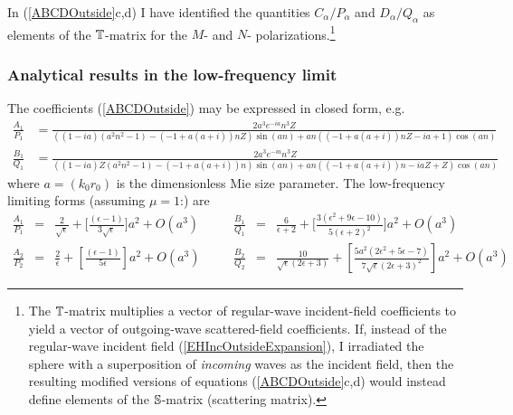 \documentclass[letterpaper]{article}
\begin{document}
In (\ref{ABCDOutside}c,d) I have identified
the quantities $C_\alpha/P_\alpha$ and $D_\alpha/Q_\alpha$
as elements of the $\mathbb{T}$-matrix for the $M$- and $N$- 
polarizations.\footnote{The $\mathbb{T}$-matrix multiplies a vector
of regular-wave incident-field coefficients to yield 
a vector of outgoing-wave scattered-field coefficients.
If, instead of the regular-wave incident field 
(\ref{EHIncOutsideExpansion}), I irradiated the sphere with
a superposition of \textit{incoming} waves as the incident field,
then the resulting modified versions of equations (\ref{ABCDOutside}c,d)
would instead define elements of the $\mathbb{S}$-matrix (scattering matrix).}

\subsubsection{Analytical results in the low-frequency limit}

The coefficients (\ref{ABCDOutside}) may be expressed in closed form, e.g.
\begin{align*}
 \frac{A_1}{P_1}
&=
   \frac{2 a^3 e^{-i a} n^3 Z}{\left((1-i a) \left(a^2 n^2-1\right)-(-1+a (a+i))
    n Z\right) \sin (a n)+a n ((-1+a (a+i)) n Z-i a+1) \cos (a n)}
\\
 \frac{B_1}{Q_1}
&=
  \frac{2 a^3 e^{-i a} n^3 Z}{\left((1-i a) Z \left(a^2 n^2-1\right)-(-1+a
    (a+i)) n\right) \sin (a n)+a n ((-1+a (a+i)) n-i a Z+Z) \cos (a n)}
\end{align*}
where $a=(k_0 r_0)$ is the dimensionless Mie size parameter.
The low-frequency limiting forms (assuming $\mu=1$:) are 
$$ \begin{array}{lclclcl}
 \displaystyle{
 \frac{A_1}{P_1}
              }
&=& 
 \displaystyle{
   \frac{2}{\sqrt{\epsilon}}
   +
   \Big[\frac{(\epsilon-1)}{3\sqrt{\epsilon}}\Big] a^2
   +O(a^3)
              }
&\quad&
 \displaystyle{
 \frac{B_1}{Q_1}
              }
&=& 
 \displaystyle{
    \frac{6}{\epsilon+2}
   +
   \Big[
   \frac{3 \left(\epsilon^2+9\epsilon-10\right)}{5 (\epsilon+2)^2}
   \Big]a^2
   +O(a^3)
              }
\\[12pt]
 \displaystyle{
\frac{A_2}{P_2}
              }
&=&
 \displaystyle{
   \frac{2}{\epsilon}
   +\left[ \frac{(\epsilon-1)}{5\epsilon}\right]a^2
   +O(a^3)
              }
&\quad&
 \displaystyle{
\frac{B_2}{Q_2}
              }
&=&
 \displaystyle{
   \frac{10}{\sqrt{\epsilon} (2 \epsilon+3)}
  +
   \left[ \frac{5 a^2 \left(2\epsilon^2+5 \epsilon-7\right)}
               {7 \sqrt{\epsilon} (2 \epsilon+3)^2}
   \right] a^2 
  +O(a^3)
              }
\end{array}$$
\end{document}
